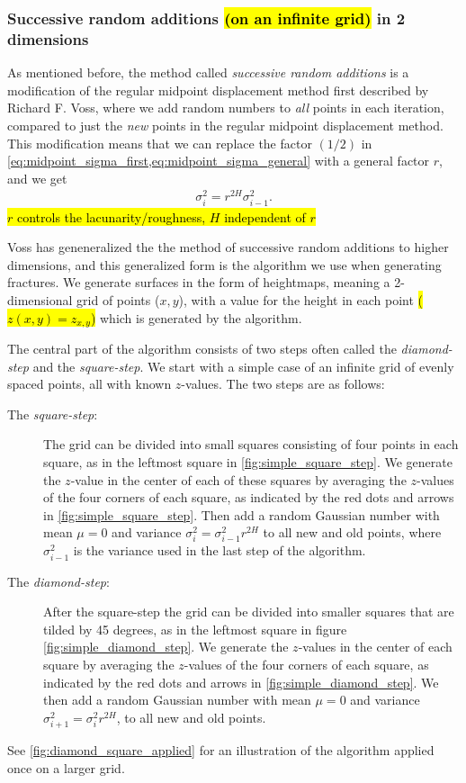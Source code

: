 \subsubsection{Successive random additions \hl{(on an infinite grid)} in 2 dimensions}
As mentioned before, the method called \emph{successive random additions} is a modification of the regular midpoint displacement method first described by Richard F. Voss\cite{voss1985random}, where we add random numbers to \emph{all} points in each iteration, compared to just the \emph{new} points in the regular midpoint displacement method. This modification means that we can replace the factor $(1/2)$ in \cref{eq:midpoint_sigma_first,eq:midpoint_sigma_general} with a general factor $r$, and we get
\begin{align*}
    \sigma_i^2 = r^{2H}\sigma^2_{i-1}.
\end{align*}
\hl{$r$ controls the lacunarity/roughness, $H$ independent of $r$}

Voss has geneneralized the the method of successive random additions to higher dimensions\cite{voss1985random}, and this generalized form is the algorithm we use when generating fractures. We generate surfaces in the form of heightmaps, meaning a 2-dimensional grid of points ({$x,y$}), with a value for the height in each point \hl{($z(x,y) = z_{x,y}$)} which is generated by the algorithm.

The central part of the algorithm consists of two steps often called the \emph{diamond-step} and the \emph{square-step}. We start with a simple case of an infinite grid of evenly spaced points, all with known $z$-values. The two steps are as follows:
\begin{description}
    \item[The \emph{square-step}:] The grid can be divided into small squares consisting of four points in each square, as in the leftmost square in \cref{fig:simple_square_step}. We generate the $z$-value in the center of each of these squares by averaging the $z$-values of the four corners of each square, as indicated by the red dots and arrows in \cref{fig:simple_square_step}. Then add a random Gaussian number with mean $\mu = 0$ and variance $\sigma_i^2 = \sigma_{i-1}^2r^{2H}$ to all new and old points, where $\sigma_{i-1}^2$ is the variance used in the last step of the algorithm.
    \label{enum:test}
    
    \item[The \emph{diamond-step}:] After the square-step the grid can be divided into smaller squares that are tilded by 45 degrees, as in the leftmost square in figure \cref{fig:simple_diamond_step}. We generate the $z$-values in the center of each square by averaging the $z$-values of the four corners of each square, as indicated by the red dots and arrows in \cref{fig:simple_diamond_step}. We then add a random Gaussian number with mean $\mu = 0$ and variance $\sigma_{i+1}^2 = \sigma_i^2r^{2H}$, to all new and old points. 
\end{description}
See \cref{fig:diamond_square_applied} for an illustration of the algorithm applied once on a larger grid. 

